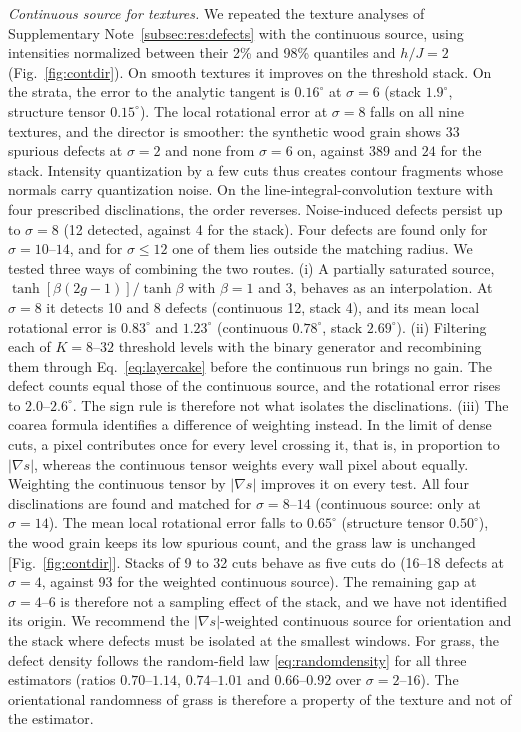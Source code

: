 \documentclass[11pt,a4paper]{article}
\begin{document}
\emph{Continuous source for textures.} We repeated the texture analyses of Supplementary Note~\ref{subsec:res:defects} with the continuous source, using intensities normalized between their 2\% and 98\% quantiles and $h/J=2$ (Fig.~\ref{fig:contdir}). On smooth textures it improves on the threshold stack. On the strata, the error to the analytic tangent is $0.16^\circ$ at $\sigma=6$ (stack $1.9^\circ$, structure tensor $0.15^\circ$). The local rotational error at $\sigma=8$ falls on all nine textures, and the director is smoother: the synthetic wood grain shows $33$ spurious defects at $\sigma=2$ and none from $\sigma=6$ on, against $389$ and $24$ for the stack. Intensity quantization by a few cuts thus creates contour fragments whose normals carry quantization noise. On the line-integral-convolution texture with four prescribed disclinations, the order reverses. Noise-induced defects persist up to $\sigma=8$ (12 detected, against 4 for the stack). Four defects are found only for $\sigma=10$--$14$, and for $\sigma\le12$ one of them lies outside the matching radius. We tested three ways of combining the two routes. (i) A partially saturated source, $\tanh[\beta(2g-1)]/\tanh\beta$ with $\beta=1$ and $3$, behaves as an interpolation. At $\sigma=8$ it detects 10 and 8 defects (continuous 12, stack 4), and its mean local rotational error is $0.83^\circ$ and $1.23^\circ$ (continuous $0.78^\circ$, stack $2.69^\circ$). (ii) Filtering each of $K=8$--$32$ threshold levels with the binary generator and recombining them through Eq.~\eqref{eq:layercake} before the continuous run brings no gain. The defect counts equal those of the continuous source, and the rotational error rises to $2.0$--$2.6^\circ$. The sign rule is therefore not what isolates the disclinations. (iii) The coarea formula identifies a difference of weighting instead. In the limit of dense cuts, a pixel contributes once for every level crossing it, that is, in proportion to $|\nabla s|$, whereas the continuous tensor weights every wall pixel about equally. Weighting the continuous tensor by $|\nabla s|$ improves it on every test. All four disclinations are found and matched for $\sigma=8$--$14$ (continuous source: only at $\sigma=14$). The mean local rotational error falls to $0.65^\circ$ (structure tensor $0.50^\circ$), the wood grain keeps its low spurious count, and the grass law is unchanged [Fig.~\ref{fig:contdir}]. Stacks of 9 to 32 cuts behave as five cuts do (16--18 defects at $\sigma=4$, against 93 for the weighted continuous source). The remaining gap at $\sigma=4$--$6$ is therefore not a sampling effect of the stack, and we have not identified its origin. We recommend the $|\nabla s|$-weighted continuous source for orientation and the stack where defects must be isolated at the smallest windows. For grass, the defect density follows the random-field law \eqref{eq:randomdensity} for all three estimators (ratios $0.70$--$1.14$, $0.74$--$1.01$ and $0.66$--$0.92$ over $\sigma=2$--$16$). The orientational randomness of grass is therefore a property of the texture and not of the estimator.
\end{document}
